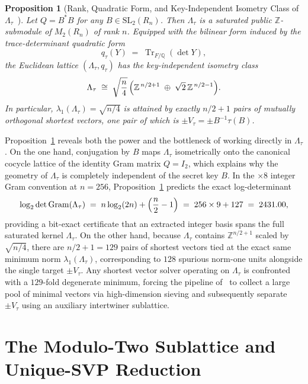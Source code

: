 \documentclass[11pt,a4paper]{article}
\newtheorem{proposition}[theorem]{Proposition}
\theoremstyle{definition}
\newcommand{\Z}{\mathbb{Z}}
\newcommand{\Q}{\mathbb{Q}}
\newcommand{\Lt}{\Lambda_\tau}
\newcommand{\Vt}{V_\tau}
\newcommand{\Tr}{\operatorname{Tr}}
\newcommand{\Gram}{\operatorname{Gram}}
\begin{document}
\begin{proposition}[Rank, Quadratic Form, and Key-Independent Isometry Class of $\Lt$~\cite{SW26}]\label{prop:lt-isom}
Let $Q = B^*B$ for any $B \in \mathrm{SL}_2(R_n)$. Then $\Lt$ is a saturated public $\Z$-submodule of $M_2(R_n)$ of rank $n$. Equipped with the bilinear form induced by the trace-determinant quadratic form
\[
  q_\tau(Y) \;=\; \Tr_{F/\Q}(\det Y),
\]
the Euclidean lattice $(\Lt, q_\tau)$ has the key-independent isometry class~\cite[Lemmas~4.3--4.4 and Proposition~4.5]{SW26}
\begin{equation}\label{eq:lt-decomp}
  \Lt \;\cong\; \sqrt{\frac{n}{4}}\,\Bigl(\Z^{\,n/2+1} \;\oplus\; \sqrt{2}\,\Z^{\,n/2-1}\Bigr).
\end{equation}
In particular, $\lambda_1(\Lt) = \sqrt{n/4}$ is attained by exactly $n/2 + 1$ pairs of mutually orthogonal shortest vectors, one pair of which is $\pm \Vt = \pm B^{-1}\tau(B)$.
\end{proposition}

Proposition~\ref{prop:lt-isom} reveals both the power and the bottleneck of working directly in $\Lt$. On the one hand, conjugation by $B$ maps $\Lt$ isometrically onto the canonical cocycle lattice of the identity Gram matrix $Q = I_2$, which explains why the geometry of $\Lt$ is completely independent of the secret key $B$. In the $\times 8$ integer Gram convention at $n=256$, Proposition~\ref{prop:lt-isom} predicts the exact log-determinant
\begin{equation}\label{eq:logdet-lt}
  \log_2 \det \Gram(\Lt) \;=\; n \log_2(2n) + \Bigl(\frac{n}{2} - 1\Bigr) \;=\; 256 \times 9 + 127 \;=\; 2431.00,
\end{equation}
providing a bit-exact certificate that an extracted integer basis spans the full saturated kernel $\Lt$. On the other hand, because $\Lt$ contains $\Z^{n/2+1}$ scaled by $\sqrt{n/4}$, there are $n/2 + 1 = 129$ pairs of shortest vectors tied at the exact same minimum norm $\lambda_1(\Lt)$, corresponding to $128$ spurious norm-one units alongside the single target $\pm \Vt$. Any shortest vector solver operating on $\Lt$ is confronted with a $129$-fold degenerate minimum, forcing the pipeline of~\cite{SW26} to collect a large pool of minimal vectors via high-dimension sieving and subsequently separate $\pm \Vt$ using an auxiliary intertwiner sublattice.

\section{The Modulo-Two Sublattice and Unique-SVP Reduction}
\label{sec:mod2}
\end{document}
